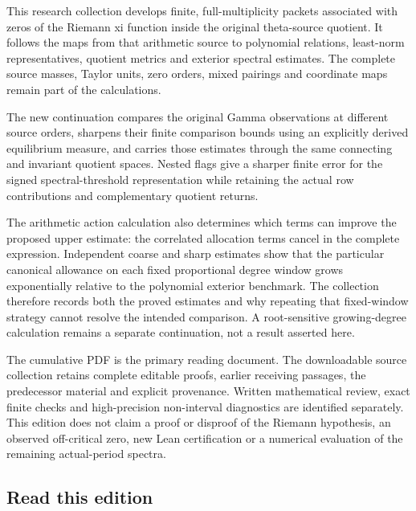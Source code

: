 \documentclass[
]{article}
\begin{document}
This research collection develops finite, full-multiplicity packets
associated with zeros of the Riemann xi function inside the original
theta-source quotient. It follows the maps from that arithmetic source
to polynomial relations, least-norm representatives, quotient metrics
and exterior spectral estimates. The complete source masses, Taylor
units, zero orders, mixed pairings and coordinate maps remain part of
the calculations.

The new continuation compares the original Gamma observations at
different source orders, sharpens their finite comparison bounds using
an explicitly derived equilibrium measure, and carries those estimates
through the same connecting and invariant quotient spaces. Nested flags
give a sharper finite error for the signed spectral-threshold
representation while retaining the actual row contributions and
complementary quotient returns.

The arithmetic action calculation also determines which terms can
improve the proposed upper estimate: the correlated allocation terms
cancel in the complete expression. Independent coarse and sharp
estimates show that the particular canonical allowance on each fixed
proportional degree window grows exponentially relative to the
polynomial exterior benchmark. The collection therefore records both the
proved estimates and why repeating that fixed-window strategy cannot
resolve the intended comparison. A root-sensitive growing-degree
calculation remains a separate continuation, not a result asserted here.

The cumulative PDF is the primary reading document. The downloadable
source collection retains complete editable proofs, earlier receiving
passages, the predecessor material and explicit provenance. Written
mathematical review, exact finite checks and high-precision non-interval
diagnostics are identified separately. This edition does not claim a
proof or disproof of the Riemann hypothesis, an observed off-critical
zero, new Lean certification or a numerical evaluation of the remaining
actual-period spectra.

\subsection{Read this edition}\label{read-this-edition-5}
\end{document}
